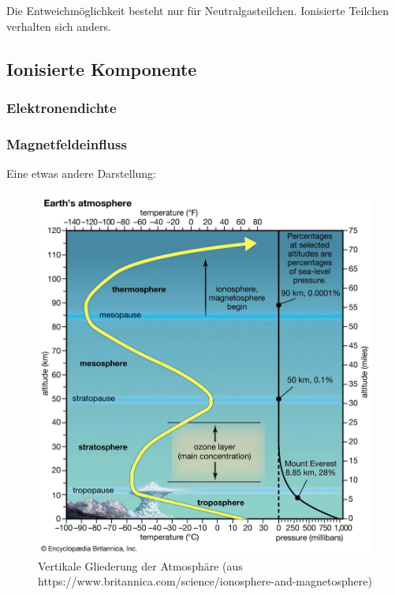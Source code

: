 \documentclass[
  a4paper,
  DIV=11]{scrreprt}
\begin{document}
Die Entweichmöglichkeit besteht nur für Neutralgasteilchen. Ionisierte
Teilchen verhalten sich anders.

\hypertarget{ionisierte-komponente}{%
\subsection{Ionisierte Komponente}\label{ionisierte-komponente}}

\hypertarget{elektronendichte}{%
\subsubsection{Elektronendichte}\label{elektronendichte}}

\hypertarget{magnetfeldeinfluss}{%
\subsubsection{Magnetfeldeinfluss}\label{magnetfeldeinfluss}}

Eine etwas andere Darstellung:

\begin{figure}

{\centering \includegraphics{./images/paste-437D2E62.png}

}

\caption{Vertikale Gliederung der Atmosphäre (aus
https://www.britannica.com/science/ionosphere-and-magnetosphere)}

\end{figure}
\end{document}

